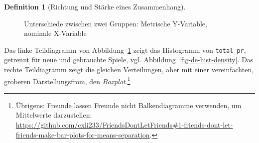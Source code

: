 \documentclass[
  a4paper,
  DIV=11]{scrreprt}
\theoremstyle{definition}
\theoremstyle{definition}
\theoremstyle{definition}
\newtheorem{definition}{Definition}[chapter]
\theoremstyle{remark}
\begin{document}
\begin{definition}[Richtung und Stärke eines
Zusammenhang]
\begin{figure}
\begin{minipage}{0.50\linewidth}
{}


\end{minipage}%

\caption{\label{fig-compare-groups1}Unterschiede zwischen zwei Gruppen:
Metrische Y-Variable, nominale X-Variable}

\end{figure}%

Das linke Teildiagramm von Abbildung~\ref{fig-compare-groups1} zeigt das
Histogramm von \texttt{total\_pr}, getrennt für neue und gebrauchte
Spiele, vgl. Abbildung~\ref{fig-de-hist-density}. Das rechte
Teildiagramm zeigt die gleichen Verteilungen, aber mit einer
vereinfachten, groberen Darstellungsfrom, den \emph{Boxplot}.\footnote{Übrigens:
  Freunde lassen Freunde nicht Balkendiagramme verwenden, um Mittelwerte
  darzustellen:
  \url{https://github.com/cxli233/FriendsDontLetFriends\#1-friends-dont-let-friends-make-bar-plots-for-means-separation}.}

\begin{figure}

\begin{minipage}{0.50\linewidth}



\end{minipage}%
%
\begin{minipage}{0.50\linewidth}

\centering{

}
\end{minipage}
\end{figure}
\end{definition}
\end{document}
